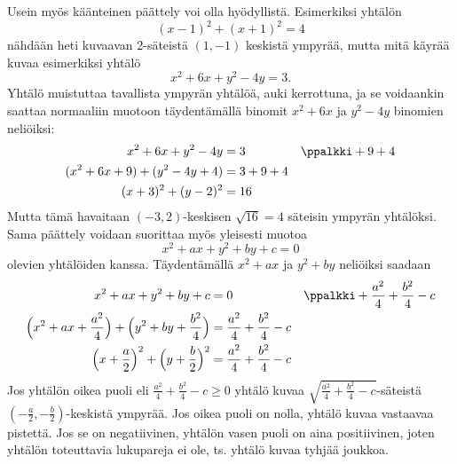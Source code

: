 Usein myös käänteinen päättely voi olla hyödyllistä. Esimerkiksi yhtälön
\[
(x-1)^2+(x+1)^2=4
\]
nähdään heti kuvaavan 2-säteistä $(1,-1)$ keskistä ympyrää, mutta mitä käyrää kuvaa esimerkiksi yhtälö
\[
x^2+6x+y^2-4y=3.
\]
Yhtälö muistuttaa tavallista ympyrän yhtälöä, auki kerrottuna, ja se voidaankin saattaa normaaliin muotoon täydentämällä binomit $x^2+6x$ ja $y^2-4y$ binomien neliöiksi:
\begin{align*}
x^2+6x+y^2-4y &= 3 && \ppalkki +9+4 \\
(x^2+6x+9)+(y^2-4y+4) &= 3+9+4 \\
(x+3)^2+(y-2)^2 &= 16
\end{align*}
Mutta tämä havaitaan $(-3,2)$-keskisen $\sqrt{16} = 4$ säteisin ympyrän yhtälöksi. Sama päättely voidaan suorittaa myös yleisesti muotoa
\[
x^2+ax+y^2+by+c = 0
\]
olevien yhtälöiden kanssa. Täydentämällä $x^2+ax$ ja $y^2+by$ neliöiksi saadaan
\begin{align*}
x^2+ax+y^2+by+c &= 0 && \ppalkki +\frac{a^2}{4}+\frac{b^2}{4}-c \\
\Big(x^2+ax+\frac{a^2}{4}\Big)+\Big(y^2+by+\frac{b^2}{4}\Big) &= \frac{a^2}{4}+\frac{b^2}{4}-c  \\
\Big(x+\frac{a}{2}\Big)^2+\Big(y+\frac{b}{2}\Big)^2 &= \frac{a^2}{4}+\frac{b^2}{4}-c
\end{align*}
Jos yhtälön oikea puoli eli $\frac{a^2}{4}+\frac{b^2}{4}-c \geq 0$ yhtälö kuvaa $\sqrt{\frac{a^2}{4}+\frac{b^2}{4}-c}$-säteistä $(-\frac{a}{2},-\frac{b}{2})$-keskistä ympyrää. Jos oikea puoli on nolla, yhtälö kuvaa vastaavaa pistettä. Jos se on negatiivinen, yhtälön vasen puoli on aina positiivinen, joten yhtälön toteuttavia lukupareja ei ole, ts. yhtälö kuvaa tyhjää joukkoa.


